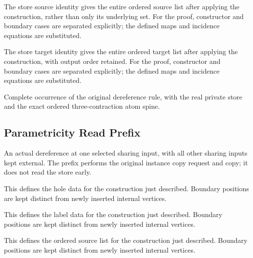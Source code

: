 The store source identity gives the entire ordered source list after applying the construction, rather than only its underlying set.
For the proof, constructor and boundary cases are separated explicitly; the defined maps and incidence equations are substituted.
\par{}

The store target identity gives the entire ordered target list after applying the construction, with output order retained.
For the proof, constructor and boundary cases are separated explicitly; the defined maps and incidence equations are substituted.
\par{}

Complete occurrence of the original dereference rule, with the real private store and the exact ordered three-contraction atom spine.
\par{}

\subsection{Parametricity Read Prefix}
An actual dereference at one selected sharing input, with all other sharing inputs kept external. The prefix performs the original instance copy request and copy; it does not read the store early.

This defines the hole data for the construction just described. Boundary positions are kept distinct from newly inserted internal vertices.
\par{}

This defines the label data for the construction just described. Boundary positions are kept distinct from newly inserted internal vertices.
\par{}

This defines the ordered source list for the construction just described. Boundary positions are kept distinct from newly inserted internal vertices.
\par{}

